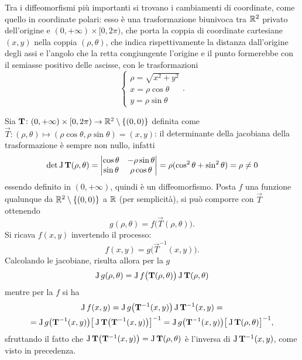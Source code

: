 Tra i diffeomorfismi più importanti si trovano i cambiamenti di coordinate, come quello in coordinate polari: esso è una trasformazione biunivoca tra $\mathbb{R}^2$ privato dell'origine e $(0,+\infty)\times[0,2\pi)$, che porta la coppia di coordinate cartesiane $(x,y)$ nella coppia $(\rho,\theta)$, che indica rispettivamente la distanza dall'origine degli assi e l'angolo che la retta congiungente l'origine e il punto formerebbe con il semiasse positivo delle ascisse, con le trasformazioni
\begin{equation}
\begin{cases}
\rho=\sqrt{x^2+y^2}\\
x=\rho\cos\theta\\
y=\rho\sin\theta
\end{cases}.
\end{equation}

Sia $\mathbf{T}\colon(0,+\infty)\times[0,2\pi)\to\mathbb{R}^2\setminus\{(0,0)\}$ definita come $\vec T\colon(\rho,\theta)\mapsto(\rho\cos\theta,\rho\sin\theta)=(x,y)$: il determinante della jacobiana della trasformazione è sempre non nullo, infatti
\[
\det\operatorname{J}\mathbf{T}(\rho,\theta)=
	\begin{vmatrix}
	\cos\theta	&-\rho\sin\theta\\
	\sin\theta	&\rho\cos\theta
	\end{vmatrix}
=\rho(\cos^2\theta+\sin^2\theta)=\rho\neq 0
\]
essendo definito in $(0,+\infty)$, quindi è un diffeomorfismo.
Posta $f$ una funzione qualunque da $\mathbb{R}^2\setminus\{(0,0)\}$ a $\mathbb{R}$ (per semplicità), si può comporre con $\vec T$ ottenendo
\[
g(\rho,\theta)=f\big(\vec T(\rho,\theta)\big).
\]
Si ricava $f(x,y)$ invertendo il processo:
\[
f(x,y)=g\big(\vec T^{-1}(x,y)\big).
\]
Calcolando le jacobiane, risulta allora per la $g$
\begin{equation} \label{eq:composizione_jacobiane_polari1}
\operatorname{J} g(\rho,\theta)=\operatorname{J} f\big(\mathbf{T}(\rho,\theta)\big)\operatorname{J}\mathbf{T}(\rho,\theta)
\end{equation}
mentre per la $f$ si ha
\begin{multline} \label{eq:composizione_jacobiane_polari2}
\operatorname{J} f(x,y)=\operatorname{J} g\big(\mathbf{T}^{-1}(x,y)\big)\operatorname{J}\mathbf{T}^{-1}(x,y)=\\
=\operatorname{J} g\big(\mathbf{T}^{-1}(x,y)\big)\big[\operatorname{J}\mathbf{T}\big(\mathbf{T}^{-1}(x,y)\big)\big]^{-1}=\operatorname{J} g\big(\mathbf{T}^{-1}(x,y)\big)\big[\operatorname{J}\mathbf{T}(\rho,\theta)\big]^{-1},
\end{multline}
sfruttando il fatto che $\operatorname{J}\mathbf{T}\big(\mathbf{T}^{-1}(x,y)\big)=\operatorname{J}\mathbf{T}(\rho,\theta)$ è l'inversa di $\operatorname{J}\mathbf{T}^{-1}(x,y)$, come visto in precedenza.

